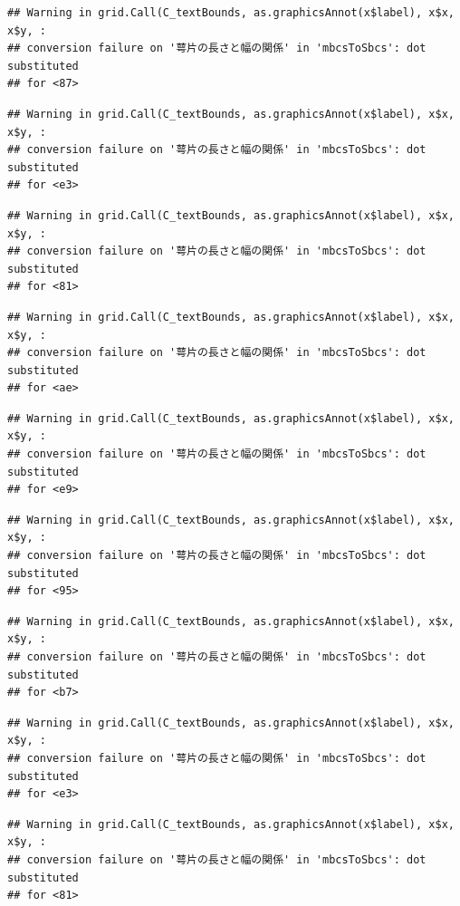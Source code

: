 \documentclass[
]{book}
\begin{document}
\begin{verbatim}
## Warning in grid.Call(C_textBounds, as.graphicsAnnot(x$label), x$x, x$y, :
## conversion failure on '萼片の長さと幅の関係' in 'mbcsToSbcs': dot substituted
## for <87>
\end{verbatim}

\begin{verbatim}
## Warning in grid.Call(C_textBounds, as.graphicsAnnot(x$label), x$x, x$y, :
## conversion failure on '萼片の長さと幅の関係' in 'mbcsToSbcs': dot substituted
## for <e3>
\end{verbatim}

\begin{verbatim}
## Warning in grid.Call(C_textBounds, as.graphicsAnnot(x$label), x$x, x$y, :
## conversion failure on '萼片の長さと幅の関係' in 'mbcsToSbcs': dot substituted
## for <81>
\end{verbatim}

\begin{verbatim}
## Warning in grid.Call(C_textBounds, as.graphicsAnnot(x$label), x$x, x$y, :
## conversion failure on '萼片の長さと幅の関係' in 'mbcsToSbcs': dot substituted
## for <ae>
\end{verbatim}

\begin{verbatim}
## Warning in grid.Call(C_textBounds, as.graphicsAnnot(x$label), x$x, x$y, :
## conversion failure on '萼片の長さと幅の関係' in 'mbcsToSbcs': dot substituted
## for <e9>
\end{verbatim}

\begin{verbatim}
## Warning in grid.Call(C_textBounds, as.graphicsAnnot(x$label), x$x, x$y, :
## conversion failure on '萼片の長さと幅の関係' in 'mbcsToSbcs': dot substituted
## for <95>
\end{verbatim}

\begin{verbatim}
## Warning in grid.Call(C_textBounds, as.graphicsAnnot(x$label), x$x, x$y, :
## conversion failure on '萼片の長さと幅の関係' in 'mbcsToSbcs': dot substituted
## for <b7>
\end{verbatim}

\begin{verbatim}
## Warning in grid.Call(C_textBounds, as.graphicsAnnot(x$label), x$x, x$y, :
## conversion failure on '萼片の長さと幅の関係' in 'mbcsToSbcs': dot substituted
## for <e3>
\end{verbatim}

\begin{verbatim}
## Warning in grid.Call(C_textBounds, as.graphicsAnnot(x$label), x$x, x$y, :
## conversion failure on '萼片の長さと幅の関係' in 'mbcsToSbcs': dot substituted
## for <81>
\end{verbatim}
\end{document}
